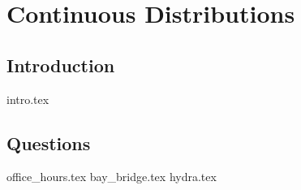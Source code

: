 \documentclass{exam}
\begin{document}
\section{Continuous Distributions}                                                                                                                                          \subsection{Introduction}                                                                                                                                                   
{intro.tex}                                                                                                      \subsection{Questions}                                                                                                                                                      
\begin{questions}                                                                                                                                                           {office_hours.tex}                                                                                               
	{bay_bridge.tex}                                                                                                
	{hydra.tex}                                                                                                     
\end{questions}     
\end{document}
